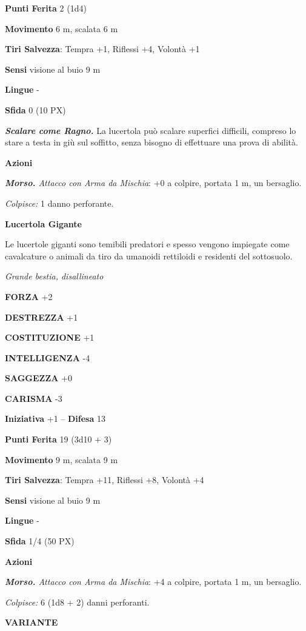 \begin{multicols}{2}
	\textbf{Punti Ferita} 2 (1d4)

	\textbf{Movimento} 6 m, scalata 6 m

	\textbf{Tiri Salvezza}: Tempra +1, Riflessi +4, Volontà +1

	\textbf{Sensi} visione al buio 9 m

	\textbf{Lingue} -

	\textbf{Sfida} 0 (10 PX)

	\textit{\textbf{Scalare come Ragno.}} La lucertola può scalare superfici difficili, compreso lo stare a testa in giù sul soffitto, senza bisogno di effettuare una prova di abilità.

	\textbf{Azioni}

	\textit{\textbf{Morso.} Attacco con Arma da Mischia}: +0 a colpire, portata 1 m, un bersaglio.

	\textit{Colpisce:} 1 danno perforante.

	\medskip\textbf{Lucertola Gigante}

	Le lucertole giganti sono temibili predatori e spesso vengono impiegate come cavalcature o animali da tiro da umanoidi rettiloidi e residenti del sottosuolo.

	\textit{Grande bestia, disallineato}

	\textbf{FORZA} +2

	\textbf{DESTREZZA} +1

	\textbf{COSTITUZIONE} +1

	\textbf{INTELLIGENZA} -4

	\textbf{SAGGEZZA} +0

	\textbf{CARISMA} -3

	\textbf{Iniziativa} +1 -- \textbf{Difesa} 13

	\textbf{Punti Ferita} 19 (3d10 + 3)

	\textbf{Movimento} 9 m, scalata 9 m

	\textbf{Tiri Salvezza}: Tempra +11, Riflessi +8, Volontà +4

	\textbf{Sensi} visione al buio 9 m

	\textbf{Lingue} -

	\textbf{Sfida} 1/4 (50 PX)

	\textbf{Azioni}

	\textit{\textbf{Morso.} Attacco con Arma da Mischia}: +4 a colpire, portata 1 m, un bersaglio.

	\textit{Colpisce:} 6 (1d8 + 2) danni perforanti.

	\textbf{VARIANTE}


\end{multicols}
